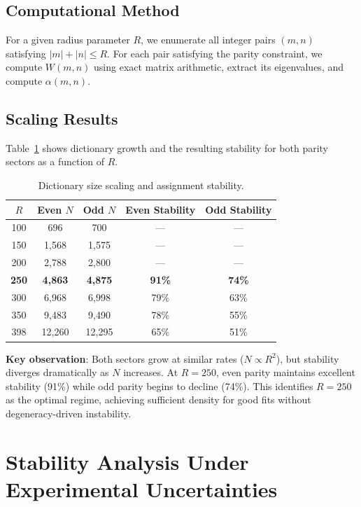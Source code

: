 \documentclass[11pt,a4paper]{article}
\begin{document}
\subsection{Computational Method}

For a given radius parameter $R$, we enumerate all integer pairs $(m,n)$ satisfying $|m| + |n| \le R$. For each pair satisfying the parity constraint, we compute $W(m,n)$ using exact matrix arithmetic, extract its eigenvalues, and compute $\alpha(m,n)$.

\subsection{Scaling Results}

Table~\ref{tab:scaling} shows dictionary growth and the resulting stability for both parity sectors as a function of $R$.

\begin{table}[h]
\centering
\caption{Dictionary size scaling and assignment stability.}
\label{tab:scaling}
\begin{tabular}{ccccc}
\toprule
$R$ & Even $N$ & Odd $N$ & Even Stability & Odd Stability \\
\midrule
100 & 696 & 700 & — & — \\
150 & 1,568 & 1,575 & — & — \\
200 & 2,788 & 2,800 & — & — \\
\textbf{250} & \textbf{4,863} & \textbf{4,875} & \textbf{91\%} & \textbf{74\%} \\
300 & 6,968 & 6,998 & 79\% & 63\% \\
350 & 9,483 & 9,490 & 78\% & 55\% \\
398 & 12,260 & 12,295 & 65\% & 51\% \\
\bottomrule
\end{tabular}
\end{table}

\textbf{Key observation}: Both sectors grow at similar rates ($N \propto R^2$), but stability diverges dramatically as $N$ increases. At $R=250$, even parity maintains excellent stability (91\%) while odd parity begins to decline (74\%). This identifies $R=250$ as the optimal regime, achieving sufficient density for good fits without degeneracy-driven instability.

\section{Stability Analysis Under Experimental Uncertainties}
\end{document}
